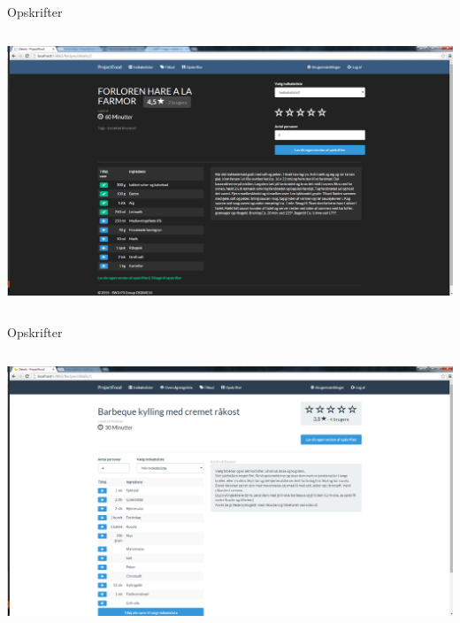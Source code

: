 \begin{frame}{Opskrifter}

	
	\begin{minipage}[0.3\textheight]{\textwidth}
	\begin{columns}[T]
	\begin{column}{1\textwidth}
	 \includegraphics[width=1\textwidth,height=1\textheight,keepaspectratio, trim={1cm 0 0 16mm}, clip]{images/Screenshots/PickedRecipeOld.png}
	
	\end{column}

	\end{columns}

  \end{minipage}
	
\end{frame}
\begin{frame}{Opskrifter}

	
	\begin{minipage}[0.3\textheight]{\textwidth}
	\begin{columns}[T]
	\begin{column}{1\textwidth}
	 \includegraphics[width=1\textwidth,height=1\textheight,keepaspectratio, trim={1cm 0 0 16mm}, clip]{images/Screenshots/PickedRecipe.png}
	
	\end{column}

	\end{columns}

  \end{minipage}
	
\end{frame}

